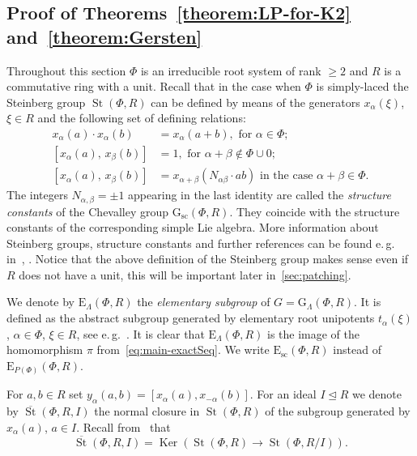 \documentclass[oneside, 11pt]{amsart} \pdfoutput=1
\newcommand{\Ker}{\mathop{\mathrm{Ker}}\nolimits}
\newcommand{\St}{\mathop{\mathrm{St}}\nolimits}
\newcommand{\E}{\mathrm{E}}
\numberwithin{equation}{section}
\theoremstyle{definition}
\begin{document}
\subsection{Proof of Theorems~\ref{theorem:LP-for-K2} and~\ref{theorem:Gersten}}
Throughout this section $\Phi$ is an irreducible root system of rank $\geq 2$ and $R$ is a commutative ring with a unit. Recall that in the case when $\Phi$ is simply-laced the Steinberg group $\St(\Phi, R)$ can be defined by means of the generators $x_\alpha(\xi)$, $\xi \in R$ and the following set of defining relations:
\begin{align}
x_{\alpha}(a)\cdot x_{\alpha}(b)&=x_{\alpha}(a+b),\text{ for } \alpha\in \Phi;\tag{R1} \label{R1}\\
[x_{\alpha}(a),\,x_{\beta}(b)]  &=1,\text{ for }\alpha+\beta\not\in\Phi\cup 0; \tag{R2} \label{R2} \\
[x_{\alpha}(a),\,x_{\beta}(b)]  &=x_{\alpha+\beta}(N_{\alpha\beta} \cdot ab)\text{ in the case }\alpha+\beta\in\Phi. \tag{R3} \label{R3} \end{align}
The integers $N_{\alpha,\beta} = \pm 1$ appearing in the last identity are called the {\it structure constants} of the Chevalley group $\mathrm{G}_\mathrm{sc}(\Phi, R)$. They coincide with the structure constants of the corresponding simple Lie algebra. More information about Steinberg groups, structure constants and further references can be found e.\,g. in~\cite[\S~3]{St71}, \cite[\S~2.4]{LSV20}. Notice that the above definition of the Steinberg group makes sense even if $R$ does not have a unit, this will be important later in~\cref{sec:patching}.

We denote by $\E_\Lambda(\Phi, R)$ the {\it elementary subgroup} of $G = \mathrm{G}_\Lambda(\Phi, R)$. It is defined as the abstract subgroup generated by elementary root unipotents $t_\alpha(\xi)$, $\alpha \in \Phi$, $\xi \in R$, see e.\,g.~\cite{St71, St78, VZ20, Abe83,}. It is clear that $\E_\Lambda(\Phi, R)$ is the image of the homomorphism $\pi$ from~\eqref{eq:main-exactSeq}. We write $\E_\mathrm{sc}(\Phi, R)$ instead of $\E_{P(\Phi)}(\Phi, R)$.

For $a, b \in R$ set $y_\alpha(a, b) = [x_\alpha(a), x_{-\alpha}(b)]$.
For an ideal $I \trianglelefteq R$ we denote by $\overline{\St}(\Phi, R, I)$ the normal closure in $\St(\Phi, R)$ of the subgroup generated by $x_\alpha(a)$, $a\in I$. Recall from~\cite[Lemma~5]{S15} that
\begin{equation} \label{eq:relative-st-ker}
 \overline{\St}(\Phi, R, I) = \Ker(\St(\Phi, R) \to \St(\Phi, R/I)).
\end{equation}
\end{document}

